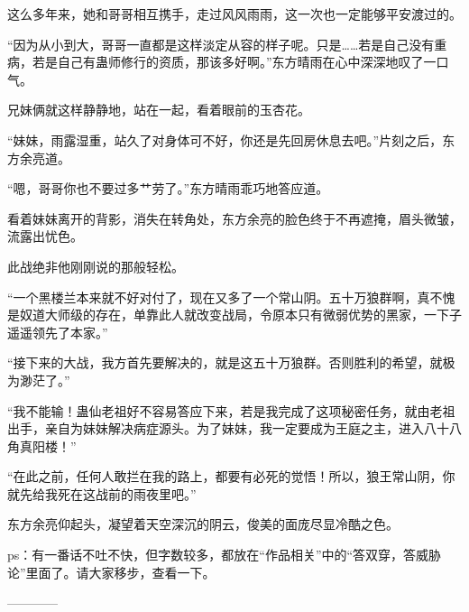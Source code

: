 \begin{this_body}
这么多年来，她和哥哥相互携手，走过风风雨雨，这一次也一定能够平安渡过的。

“因为从小到大，哥哥一直都是这样淡定从容的样子呢。只是……若是自己没有重病，若是自己有蛊师修行的资质，那该多好啊。”东方晴雨在心中深深地叹了一口气。

兄妹俩就这样静静地，站在一起，看着眼前的玉杏花。

“妹妹，雨露湿重，站久了对身体可不好，你还是先回房休息去吧。”片刻之后，东方余亮道。

“嗯，哥哥你也不要过多艹劳了。”东方晴雨乖巧地答应道。

看着妹妹离开的背影，消失在转角处，东方余亮的脸色终于不再遮掩，眉头微皱，流露出忧色。

此战绝非他刚刚说的那般轻松。

“一个黑楼兰本来就不好对付了，现在又多了一个常山阴。五十万狼群啊，真不愧是奴道大师级的存在，单靠此人就改变战局，令原本只有微弱优势的黑家，一下子遥遥领先了本家。”

“接下来的大战，我方首先要解决的，就是这五十万狼群。否则胜利的希望，就极为渺茫了。”

“我不能输！蛊仙老祖好不容易答应下来，若是我完成了这项秘密任务，就由老祖出手，亲自为妹妹解决病症源头。为了妹妹，我一定要成为王庭之主，进入八十八角真阳楼！”

“在此之前，任何人敢拦在我的路上，都要有必死的觉悟！所以，狼王常山阴，你就先给我死在这战前的雨夜里吧。”

东方余亮仰起头，凝望着天空深沉的阴云，俊美的面庞尽显冷酷之色。

ps：有一番话不吐不快，但字数较多，都放在“作品相关”中的“答双穿，答威胁论”里面了。请大家移步，查看一下。

------------

\end{this_body}

